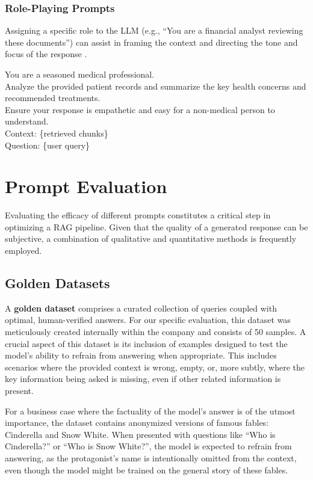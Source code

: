 \subsubsection{Role-Playing Prompts}
Assigning a specific role to the LLM (e.g., \enquote{You are a financial analyst reviewing these documents}) can assist in framing the context and directing the tone and focus of the response \autocite{tseng-etal-2024-two}.

\begin{tcolorbox}[promptbox,title=Example: Role-Playing Prompt]
You are a seasoned medical professional.\\
Analyze the provided patient records and summarize the key health concerns and recommended treatments.\\
Ensure your response is empathetic and easy for a non-medical person to understand.\\

Context: \{retrieved chunks\}\\

Question: \{user query\}
\end{tcolorbox}

\section{Prompt Evaluation}
Evaluating the efficacy of different prompts constitutes a critical step in optimizing a RAG pipeline. Given that the quality of a generated response can be subjective, a combination of qualitative and quantitative methods is frequently employed.

\subsection{Golden Datasets}
A \textbf{golden dataset} comprises a curated collection of queries coupled with optimal, human-verified answers. For our specific evaluation, this dataset was meticulously created internally within the company and consists of 50 samples. A crucial aspect of this dataset is its inclusion of examples designed to test the model's ability to refrain from answering when appropriate. This includes scenarios where the provided context is wrong, empty, or, more subtly, where the key information being asked is missing, even if other related information is present.

For a business case where the factuality of the model's answer is of the utmost importance, the dataset contains anonymized versions of famous fables: Cinderella and Snow White. When presented with questions like \enquote{Who is Cinderella?} or \enquote{Who is Snow White?}, the model is expected to refrain from answering, as the protagonist's name is intentionally omitted from the context, even though the model might be trained on the general story of these fables.

